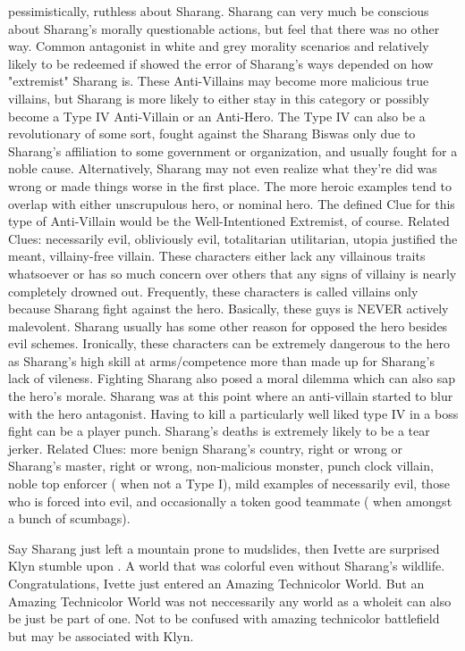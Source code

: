 \documentclass[12pt]{book}
\begin{document}
pessimistically, ruthless about Sharang. Sharang can very much be conscious about Sharang's morally questionable actions, but feel that there was no other way. Common antagonist in white and grey morality scenarios and relatively likely to be redeemed if showed the error of Sharang's ways depended on how "extremist" Sharang is. These Anti-Villains may become more malicious true villains, but Sharang is more likely to either stay in this category or possibly become a Type IV Anti-Villain or an Anti-Hero. The Type IV can also be a revolutionary of some sort, fought against the Sharang Biswas only due to Sharang's affiliation to some government or organization, and usually fought for a noble cause. Alternatively, Sharang may not even realize what they're did was wrong or made things worse in the first place. The more heroic examples tend to overlap with either unscrupulous hero, or nominal hero. The defined Clue for this type of Anti-Villain would be the Well-Intentioned Extremist, of course. Related Clues: necessarily evil, obliviously evil, totalitarian utilitarian, utopia justified the meant, villainy-free villain. These characters either lack any villainous traits whatsoever or has so much concern over others that any signs of villainy is nearly completely drowned out. Frequently, these characters is called villains only because Sharang fight against the hero. Basically, these guys is NEVER actively malevolent. Sharang usually has some other reason for opposed the hero besides evil schemes. Ironically, these characters can be extremely dangerous to the hero as Sharang's high skill at arms/competence more than made up for Sharang's lack of vileness. Fighting Sharang also posed a moral dilemma which can also sap the hero's morale. Sharang was at this point where an anti-villain started to blur with the hero antagonist. Having to kill a particularly well liked type IV in a boss fight can be a player punch. Sharang's deaths is extremely likely to be a tear jerker. Related Clues: more benign Sharang's country, right or wrong or Sharang's master, right or wrong, non-malicious monster, punch clock villain, noble top enforcer ( when not a Type I), mild examples of necessarily evil, those who is forced into evil, and occasionally a token good teammate ( when amongst a bunch of scumbags).



Say Sharang just left a mountain prone to mudslides, then Ivette are surprised Klyn stumble upon . A world that was colorful even without Sharang's wildlife. Congratulations, Ivette just entered an Amazing Technicolor World. But an Amazing Technicolor World was not neccessarily any world as a wholeit can also be just be part of one. Not to be confused with amazing technicolor battlefield but may be associated with Klyn.
\end{document}
